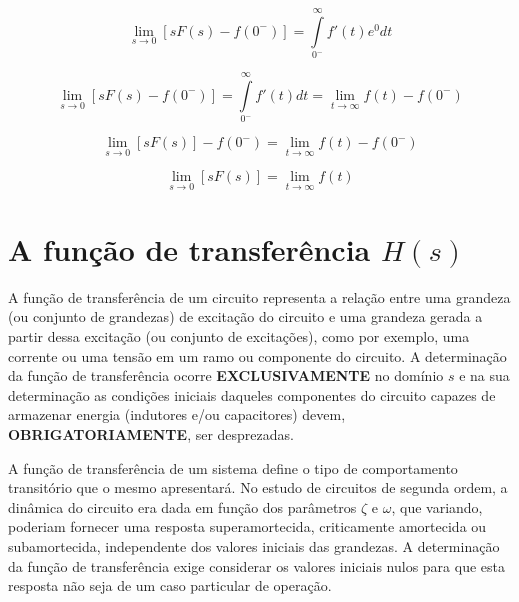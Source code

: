 \documentclass[12pt,fleqn]{book} %
\begin{document}
        \begin{equation}
        \lim_{s\rightarrow0}[sF(s)-f(0^-)] = \int\limits_{0^-}^{\infty}f'(t)e^{0}dt
        \end{equation}
        
        \begin{equation}
        \lim_{s\rightarrow0}[sF(s)-f(0^-)] = \int\limits_{0^-}^{\infty}f'(t)dt = \lim_{t\rightarrow\infty}f(t)-f(0^-)
        \end{equation}
        
        \begin{equation}
        \lim_{s\rightarrow0}[sF(s)]-f(0^-) =  \lim_{t\rightarrow\infty}f(t)-f(0^-)
        \end{equation}
        
        \begin{equation}
        \lim_{s\rightarrow0}[sF(s)] =  \lim_{t\rightarrow\infty}f(t)
        \end{equation}
        
	
\chapter{A função de transferência $H(s)$}

A função de transferência de um circuito representa a relação entre uma grandeza (ou conjunto de grandezas) de excitação do circuito e uma grandeza gerada a partir dessa excitação (ou conjunto de excitações), como por exemplo, uma corrente ou uma tensão em um ramo ou componente do circuito. A determinação da função de transferência ocorre \textbf{EXCLUSIVAMENTE} no domínio $s$ e na sua determinação as condições iniciais daqueles componentes do circuito capazes de armazenar energia (indutores e/ou capacitores) devem, \textbf{OBRIGATORIAMENTE}, ser desprezadas.

A função de transferência de um sistema define o tipo de comportamento transitório que o mesmo apresentará. No estudo de circuitos de segunda ordem, a dinâmica do circuito era dada em função dos parâmetros $\zeta$ e $\omega$, que variando, poderiam fornecer uma resposta superamortecida, criticamente amortecida ou subamortecida, independente dos valores iniciais das grandezas. A determinação da função de transferência exige considerar os valores iniciais nulos para que esta resposta não seja de um caso particular de operação.
\end{document}
